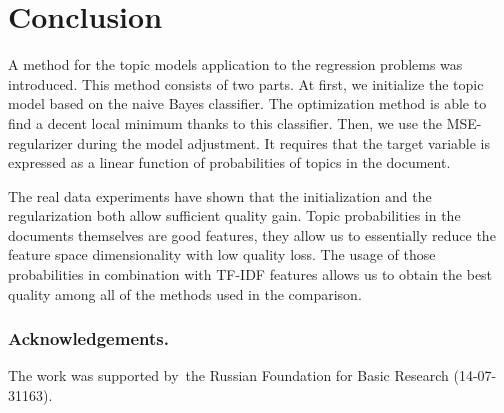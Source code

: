 \documentclass{sig-alternate-2013}
\begin{document}
\section{Conclusion}

A method for the topic models application to the regression problems was introduced. This method consists of two parts. At first, we initialize the topic model based on the naive Bayes classifier. The optimization method is able to find a decent local minimum thanks to this classifier. Then, we use the  MSE-regularizer during the model adjustment. It requires that the target variable is expressed as a linear function of probabilities of topics in the document.


The real data experiments have shown that the initialization and the regularization
both allow sufficient quality gain. Topic probabilities in the documents themselves are good features, they allow
us to essentially reduce the feature space dimensionality with low quality loss.
The usage of those probabilities in combination with TF-IDF features allows us to obtain
the best quality among all of the methods used in the comparison.

\bigskip
\subsubsection*{Acknowledgements.}
\nopagebreak
The work was supported by~the Russian Foundation for Basic Research (14-07-31163).
\end{document}
